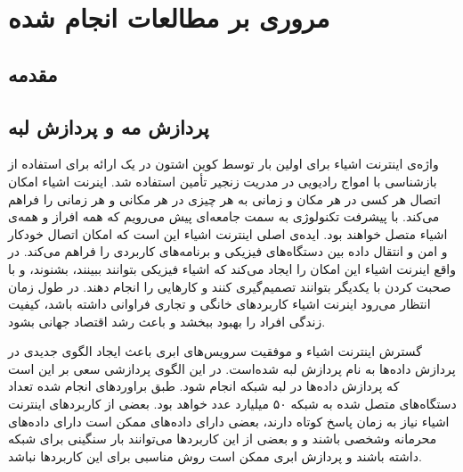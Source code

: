 \chapter{مروری بر مطالعات انجام شده}\label{chap:literature_review}
  \thispagestyle{empty}
  \section{مقدمه}
  \section{پردازش مه و پردازش لبه}
    واژه‌ی اینترنت اشیاء برای اولین بار توسط کوین اشتون در یک ارائه برای استفاده از بازشناسی با امواج رادیویی در مدریت زنجیر تأمین استفاده شد\cite{shton2009that}.
    اینرنت اشیاء امکان اتصال هر کسی در هر مکان و زمانی به هر چیزی در هر مکانی و هر زمانی را فراهم می‌کند.
    با پیشرفت تکنولوژی به سمت جامعه‌ای پیش می‌رویم که همه افراز و همه‌ی اشیاء متصل خواهند بود\cite{zheng2011internet}.
    ایده‌ی اصلی اینترنت اشیاء این است که امکان اتصال خودکار و امن و انتقال داده‌ بین دستگاه‌های فیزیکی و برنامه‌های کاربردی را فراهم می‌کند.
    در واقع اینرنت اشیاء این امکان را ایجاد می‌کند که اشیاء فیزیکی بتوانند ببینند، بشنوند، و با صحبت کردن با یکدیگر بتوانند تصمیم‌گیری کنند و کار‌هایی را انجام دهند\cite{al2015internet}.
    در طول زمان انتظار می‌رود اینرنت اشیاء کاربرد‌های خانگی و تجاری فراوانی داشته باشد، کیفیت زندگی افراد را بهبود ببخشد و باعث رشد اقتصاد جهانی بشود.

    گسترش اینترنت اشیاء و موفقیت سرویس‌های ابری باعث ایجاد الگو‌ی جدیدی در پردازش داده‌ها به نام پردازش لبه  شده‌است.
    در این الگوی پردازشی سعی بر این است که پردازش داده‌ها در لبه شبکه انجام شود.
    طبق براورد‌های انجام شده \cite{2018cisco} تعداد دستگاه‌های متصل شده به شبکه ۵۰ میلیارد عدد خواهد بود.
    بعضی از کاربردهای اینترنت اشیاء نیاز به زمان پاسخ کوتاه دارند، بعضی دارای داده‌های ممکن است دارای داده‌های محرمانه وشخصی باشند و و بعضی از این کاربرد‌ها می‌توانند بار سنگینی برای شبکه داشته باشند و پردازش ابری ممکن است روش مناسبی برای این کاربرد‌ها نباشد.

